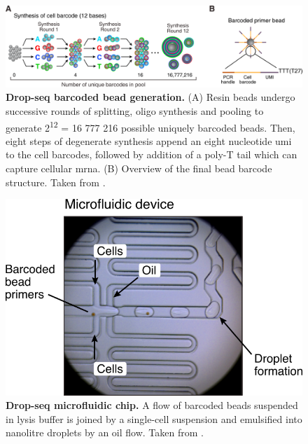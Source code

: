 \begin{figure}[ht]
	\centerfloat
	\includegraphics[width=\textwidth]{./ims/macosko2015_1.png}
	\caption[Drop-seq barcoded bead generation]{\textbf{Drop-seq barcoded bead generation.} (A) Resin beads undergo successive rounds of splitting, oligo synthesis and pooling to generate 2\textsuperscript{12} = 16 777 216 possible uniquely barcoded beads. Then, eight steps of degenerate synthesis append an eight nucleotide \acrshort{umi} to the cell barcodes, followed by addition of a poly-T tail which can capture cellular \acrshort{mrna}. (B) Overview of the final bead barcode structure. Taken from \cite{macosko2015}.}
	\label{fig:macosko2015_1}
\end{figure}

\begin{figure}[ht]
\begin{minipage}[]{0.5\textwidth}
	\includegraphics[width=\textwidth]{./ims/macosko2015_2.png}
\end{minipage}\hfill
\begin{minipage}[]{0.45\textwidth}
	\caption[Drop-seq microfluidic chip]{\textbf{Drop-seq microfluidic chip.} A flow of barcoded beads suspended in lysis buffer is joined by a single-cell suspension and emulsified into nanolitre droplets by an oil flow. Taken from \cite{macosko2015}.}
	\label{fig:macosko2015_2}
\end{minipage}
\end{figure}

